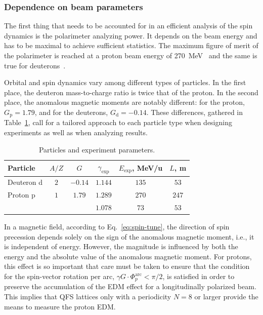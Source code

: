 \subsubsection{Dependence on beam parameters}

The first thing that needs to be accounted for in an efficient analysis of
the spin dynamics is the polarimeter analyzing power. It depends on the beam
energy and has to be maximal to achieve sufficient statistics. The maximum
figure of merit of the polarimeter is reached at a proton beam energy of
\SI{270}{MeV}~\cite{Mcnaughton:1985wyt} and the same is true for
deuterons~\cite{Kurilkin:2010ym}.

Orbital and spin dynamics vary among different types of particles. In the
first place, the deuteron mass-to-charge ratio is twice that of the proton.
In the second place, the anomalous magnetic moments are notably different:
for the proton, $G_{\mathrm{p}} = 1.79$, and for the deuterons,
$G_{\mathrm{d}} = -0.14$. These differences, gathered in
Table~\ref{tab:particles}, call for a tailored approach to each particle
type when designing experiments as well as when analyzing results.

\begin{table}[htbp]
  \centering
  \caption{Particles and experiment parameters.}
  \label{tab:particles}
  \begin{tabular}{lccccc}
    \toprule
    Particle & $A/Z$ & $G$ & $\gamma_{\mathrm{exp}}$ & $E_{\mathrm{exp}}$, MeV/u & $L$, m \\
    \midrule
    Deuteron d & $2$ & $-0.14$ & $1.144$ & $135$ & $53$ \\
    Proton p & $1$ & $1.79$ & $1.289$ & $270$ & $247$ \\
    & & & $1.078$ & $73$ & $53$ \\
    \bottomrule
  \end{tabular}
\end{table}

In a magnetic field, according to Eq.~\eqref{eq:spin-tune}, the direction of
spin precession depends solely on the sign of the anomalous magnetic moment,
i.e., it is independent of energy. However, the magnitude is influenced by both
the energy and the absolute value of the anomalous magnetic moment. For protons, this effect is so important that care must be taken to ensure
that the condition for the spin-vector rotation per arc,
$\gamma G \cdot \Phi_{p}^{\mathrm{arc}} < \pi/2$, is satisfied in order to
preserve the accumulation of the EDM effect for a longitudinally polarized
beam. This implies that QFS lattices only with a periodicity $N=8$ or larger
provide the means to measure the proton EDM.

